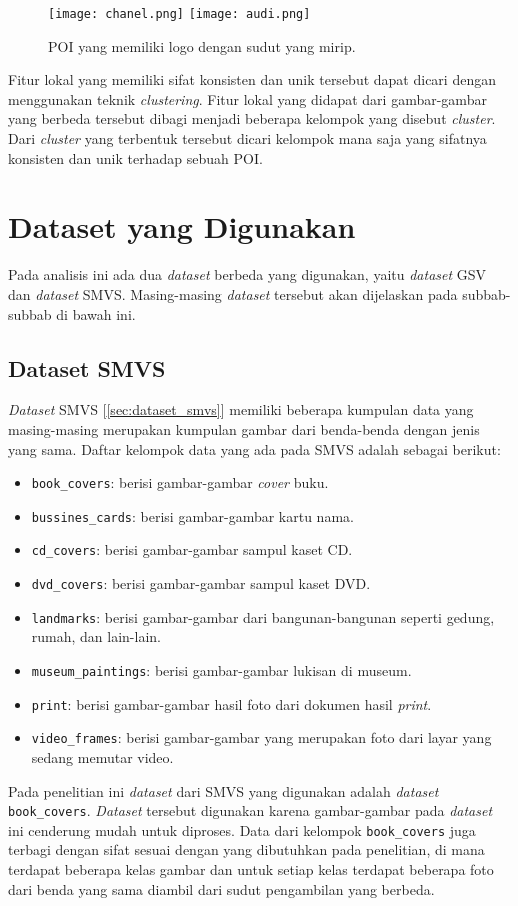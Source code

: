 \begin{figure}[H]
	\centering
	\texttt{[image: chanel.png]}
	\texttt{[image: audi.png]}
	\caption{POI yang memiliki logo dengan sudut yang mirip.}
	\label{fig:logo_tidak_unik}
\end{figure}

Fitur lokal yang memiliki sifat konsisten dan unik tersebut dapat dicari dengan menggunakan teknik \textit{clustering}. Fitur lokal yang didapat dari gambar-gambar yang berbeda tersebut dibagi menjadi beberapa kelompok yang disebut \textit{cluster}. Dari \textit{cluster} yang terbentuk tersebut dicari kelompok mana saja yang sifatnya konsisten dan unik terhadap sebuah POI. 

\section{Dataset yang Digunakan}
Pada analisis ini ada dua \textit{dataset} berbeda yang digunakan, yaitu \textit{dataset} GSV dan \textit{dataset} SMVS. Masing-masing \textit{dataset} tersebut akan dijelaskan pada subbab-subbab di bawah ini.
\subsection{Dataset SMVS}
\label{subsec:dataset_smvs}
\textit{Dataset} SMVS [\ref{sec:dataset_smvs}] memiliki beberapa kumpulan data yang masing-masing merupakan kumpulan gambar dari benda-benda dengan jenis yang sama. Daftar kelompok data yang ada pada SMVS adalah sebagai berikut:
\begin{itemize}
	\item \texttt{book\_covers}: berisi gambar-gambar \textit{cover} buku.
	\item \texttt{bussines\_cards}: berisi gambar-gambar kartu nama.
	\item \texttt{cd\_covers}: berisi gambar-gambar sampul kaset CD.
	\item \texttt{dvd\_covers}: berisi gambar-gambar sampul kaset DVD.
	\item \texttt{landmarks}: berisi gambar-gambar dari bangunan-bangunan seperti gedung, rumah, dan lain-lain.
	\item \texttt{museum\_paintings}: berisi gambar-gambar lukisan di museum.
	\item \texttt{print}: berisi gambar-gambar hasil foto dari dokumen hasil \textit{print}.
	\item \texttt{video\_frames}: berisi gambar-gambar yang merupakan foto dari layar yang sedang memutar video.
\end{itemize}
Pada penelitian ini \textit{dataset} dari SMVS yang digunakan adalah \textit{dataset} \texttt{book\_covers}. \textit{Dataset} tersebut digunakan karena gambar-gambar pada \textit{dataset} ini cenderung mudah untuk diproses. Data dari kelompok \texttt{book\_covers} juga terbagi dengan sifat sesuai dengan yang dibutuhkan pada penelitian, di mana terdapat beberapa kelas gambar dan untuk setiap kelas terdapat beberapa foto dari benda yang sama diambil dari sudut pengambilan yang berbeda. 

